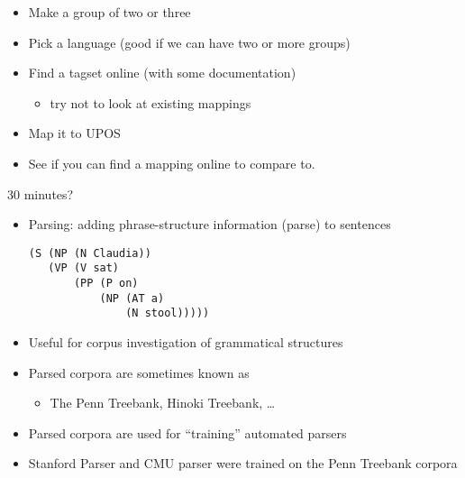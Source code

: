 \documentclass[a4paper,landscape,headrule,footrule,xetex]{foils}
\begin{document}
\begin{itemize}
\item Make a group of two or three
\item Pick a language (good if we can have two or more groups)
\item Find a tagset online (with some documentation)
  \begin{itemize}
  \item try not to look at existing mappings
  \end{itemize}
\item Map it to UPOS
\item See if you can find a mapping online to compare to.
\end{itemize}

30 minutes?

\begin{itemize}\addtolength{\itemsep}{-1.5ex}
\item  Parsing: adding phrase-structure information (parse) to sentences
\begin{verbatim}
(S (NP (N Claudia))
   (VP (V sat)
       (PP (P on)
           (NP (AT a)
               (N stool)))))
\end{verbatim}

\item  Useful for corpus investigation of grammatical structures
\item  Parsed corpora are sometimes known as 
  \begin{itemize}
  \item The Penn Treebank, Hinoki Treebank, \ldots
  \end{itemize}
\item  Parsed corpora are used for ``training'' automated parsers
\item  Stanford Parser and CMU parser were trained on the Penn Treebank corpora
\end{itemize}
\end{document}
